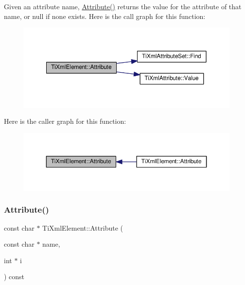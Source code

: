 Given an attribute name, \hyperlink{class_ti_xml_element_a6042f518748f475a7ac4b4e0b509eb05}{Attribute()} returns the value for the attribute of that name, or null if none exists. Here is the call graph for this function\+:\nopagebreak
\begin{figure}[H]
\begin{center}
\leavevmode
\includegraphics[width=350pt]{class_ti_xml_element_a6042f518748f475a7ac4b4e0b509eb05_cgraph}
\end{center}
\end{figure}
Here is the caller graph for this function\+:\nopagebreak
\begin{figure}[H]
\begin{center}
\leavevmode
\includegraphics[width=350pt]{class_ti_xml_element_a6042f518748f475a7ac4b4e0b509eb05_icgraph}
\end{center}
\end{figure}
\mbox{\label{class_ti_xml_element_a8005d0b808fd02bd1246710cdf95e5f6}} 
\subsubsection{\texorpdfstring{Attribute()}{Attribute()}\hspace{0.1cm}{\footnotesize\ttfamily [2/3]}}
{\footnotesize\ttfamily const char $\ast$ Ti\+Xml\+Element\+::\+Attribute (\begin{DoxyParamCaption}\item[{const char $\ast$}]{name,  }\item[{int $\ast$}]{i }\end{DoxyParamCaption}) const}

